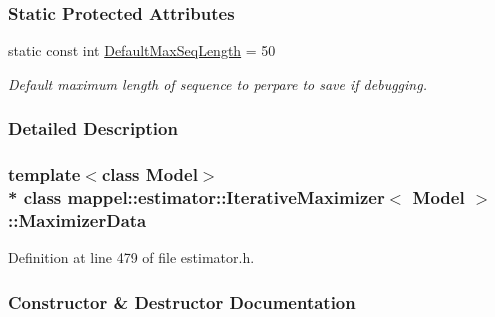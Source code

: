 \subsubsection*{Static Protected Attributes}
\begin{DoxyCompactItemize}
\item 
static const int \hyperlink{classmappel_1_1estimator_1_1IterativeMaximizer_1_1MaximizerData_a38e997edb1943f364f5ec1f997d5b254}{Default\+Max\+Seq\+Length} = 50
\begin{DoxyCompactList}\small\item\em Default maximum length of sequence to perpare to save if debugging. \end{DoxyCompactList}\end{DoxyCompactItemize}


\subsubsection{Detailed Description}
\subsubsection*{template$<$class Model$>$\\*
class mappel\+::estimator\+::\+Iterative\+Maximizer$<$ Model $>$\+::\+Maximizer\+Data}



Definition at line 479 of file estimator.\+h.



\subsubsection{Constructor \& Destructor Documentation}
